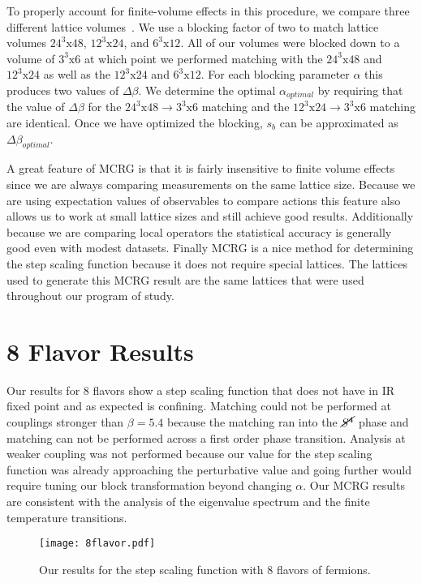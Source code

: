 \documentclass{PoS}
\newcommand{\Sb}{\ensuremath{\cancel{S^4}} }
\begin{document}
To properly account for finite-volume effects in this procedure, we compare three different lattice volumes~\cite{Hasenfratz:2011xn}.
We use a blocking factor of two to match lattice volumes $24^3\mbox{x}48$, $12^3\mbox{x}24$, and $6^3\mbox{x}12$.
All of our volumes were blocked down to a volume of $3^3\mbox{x}6$ at which point we performed matching with the $24^3\mbox{x}48$ and $12^3\mbox{x}24$ as well as the $12^3\mbox{x}24$ and $6^3\mbox{x}12$.
For each blocking parameter $\alpha$ this produces two values of $\Delta\beta$.
We determine the optimal $\alpha_{optimal}$ by requiring that the value of $\Delta\beta$ for the $24^3\mbox{x}48\to3^3\mbox{x}6$ matching and the $12^3\mbox{x}24\to3^3\mbox{x}6$ matching are identical.
Once we have optimized the blocking, $s_b$ can be approximated as $\Delta\beta_{optimal}$.

A great feature of MCRG is that it is fairly insensitive to finite volume effects since we are always comparing measurements on the same lattice size.
Because we are using expectation values of observables to compare actions this feature also allows us to work at small lattice sizes and still achieve good results.
Additionally because we are comparing local operators the statistical accuracy is generally good even with modest datasets.
Finally MCRG is a nice method for determining the step scaling function because it does not require special lattices.
The lattices used to generate this MCRG result are the same lattices that were used throughout our program of study.

\section{\label{sec:8flavor}8 Flavor Results}
Our results for 8 flavors show a step scaling function that does not have in IR fixed point and as expected is confining.
Matching could not be performed at couplings stronger than $\beta = 5.4$ because the matching ran into the \Sb phase and matching can not be performed across a first order phase transition.
Analysis at weaker coupling was not performed because our value for the step scaling function was already approaching the perturbative value and going further would require tuning our block transformation beyond changing $\alpha$.  
Our MCRG results are consistent with the analysis of the eigenvalue spectrum and the finite temperature transitions.

\begin{figure}[htpb]
  \centering
  \texttt{[image: 8flavor.pdf]}
  \caption{Our results for the step scaling function with 8 flavors of fermions.}
  \label{fig:8flavor}
\end{figure}
\end{document}
